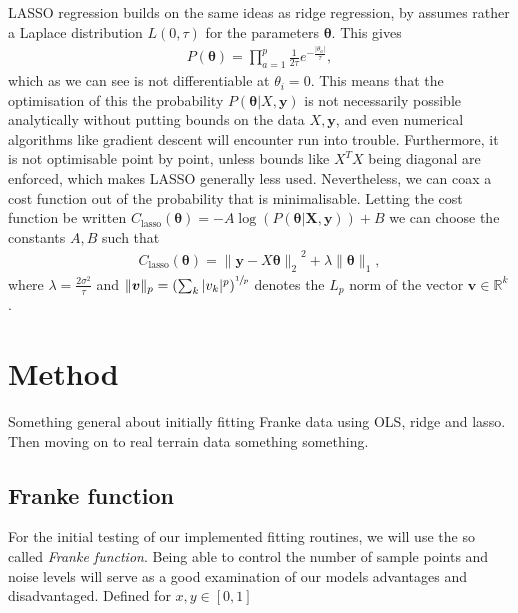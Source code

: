 \documentclass[twocolumn,english,notitlepage]{article}
\renewcommand{\vec}[1]{\boldsymbol{#1}}
\newcommand{\pclosed}[1]{\left(#1\right)}
\renewcommand{\norm}[2][]{\ensuremath{\|#2\|_{#1}}}
\renewcommand{\exp}[1]{e^{#1}}
\newcommand{\msub}[2]{\ensuremath{{#1}_\text{#2}}}
\begin{document}
            LASSO regression builds on the same ideas as ridge regression, by assumes rather a Laplace distribution $L(0, \tau)$ for the parameters $\vec{\theta}$. This gives
            \begin{align}
                P(\vec{\theta}) = \prod_{a=1}^{p} \frac{1}{2\tau} \exp{-\frac{|\theta_a|}{\tau}},
            \end{align}
            which as we can see is not differentiable at $\theta_i = 0$. This means that the optimisation of this the probability $P(\vec{\theta}|X, \vec{y})$ is not necessarily possible analytically without putting bounds on the data $X, \vec{y}$, and even numerical algorithms like gradient descent will encounter run into trouble. Furthermore, it is not optimisable point by point, unless bounds like $X^TX$ being diagonal are enforced, which makes LASSO generally less used. Nevertheless, we can coax a cost function out of the probability that is minimalisable. Letting the cost function be written $\msub{C}{lasso}(\vec{\theta}) = -A\log\pclosed{P(\vec{\theta|X,\vec{y}})} + B$  we can choose the constants $A, B$ such that
            \begin{align}
                \boxed{
                    \msub{C}{lasso}(\vec{\vec{\theta}}) = \norm[2]{ \vec{y} - X\vec{\theta} }^2 + \lambda \norm[1]{\vec{\theta}},
                }
            \end{align}
            where $\lambda = \frac{2\sigma^2}{\tau}$ and $\norm[p]{\vec{v}} = \pclosed{\sum_k |v_k|^p}^{\sfrac{1}{p}}$ denotes the $L_p$ norm of the vector $\vec{v} \in \mathbb{R}^k$.


\section{Method}
Something general about initially fitting Franke data using OLS, ridge and lasso. Then moving on to real terrain data something something.
    
    \subsection{Franke function}

    For the initial testing of our implemented fitting routines, we will use the so called \textit{Franke function}. Being able to control the number of sample points and noise levels will serve as a good examination of our models advantages and disadvantaged. Defined for $x, y \in [0,1]$
\end{document}
